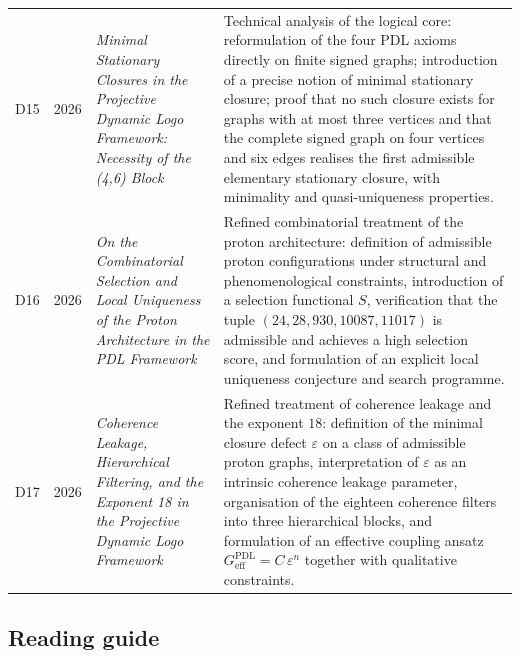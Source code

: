 \documentclass{article}
\newcommand{\PDL}{\mathrm{PDL}}
\begin{document}
\begin{longtable}{@{}llL{4cm}p{9.5cm}@{}}
D15 & 2026 & \textit{Minimal Stationary Closures in the Projective Dynamic Logo Framework: Necessity of the (4,6) Block} &
Technical analysis of the logical core: reformulation of the four PDL axioms directly on finite signed graphs; introduction of a precise notion of minimal stationary closure; proof that no such closure exists for graphs with at most three vertices and that the complete signed graph on four vertices and six edges realises the first admissible elementary stationary closure, with minimality and quasi-uniqueness properties. \cite{Minimal_Stationary_Closures_2026} \\[0.5em]

D16 & 2026 & \textit{On the Combinatorial Selection and Local Uniqueness of the Proton Architecture in the PDL Framework} &
Refined combinatorial treatment of the proton architecture: definition of admissible proton configurations under structural and phenomenological constraints, introduction of a selection functional $S$, verification that the tuple $(24,28,930,10087,11017)$ is admissible and achieves a high selection score, and formulation of an explicit local uniqueness conjecture and search programme. \cite{Proton_Local_Uniqueness_2026,Combinatorial_Proton_v2_2026} \\[0.5em]

D17 & 2026 & \textit{Coherence Leakage, Hierarchical Filtering, and the Exponent 18 in the Projective Dynamic Logo Framework} &
Refined treatment of coherence leakage and the exponent $18$: definition of the minimal closure defect $\varepsilon$ on a class of admissible proton graphs, interpretation of $\varepsilon$ as an intrinsic coherence leakage parameter, organisation of the eighteen coherence filters into three hierarchical blocks, and formulation of an effective coupling ansatz $G_{\mathrm{eff}}^{\PDL}=C\,\varepsilon^{n}$ together with qualitative constraints. \cite{Coherence_Leakage_18_2026,Topological_Reformulation_PDL_2026,Effective_Fields_PDL_2026} \\[0.5em]

\bottomrule
\end{longtable}

\subsection*{Reading guide}
\end{document}
